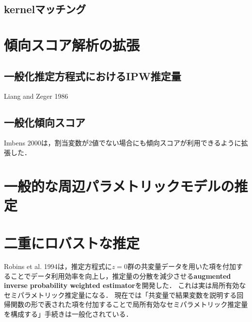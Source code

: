 \documentclass[uplatex,dvipdfmx]{jsreport}
\begin{document}
\subsection{kernelマッチング}

\section{傾向スコア解析の拡張}

\subsection{一般化推定方程式におけるIPW推定量}

\begin{tcolorbox}[colframe=ForestGreen, colback=ForestGreen!10!white,breakable,colbacktitle=ForestGreen!40!white,coltitle=black,fonttitle=\bfseries\sffamily,
title=]
    Liang and Zeger 1986
\end{tcolorbox}

\subsection{一般化傾向スコア}

\begin{tcolorbox}[colframe=ForestGreen, colback=ForestGreen!10!white,breakable,colbacktitle=ForestGreen!40!white,coltitle=black,fonttitle=\bfseries\sffamily,
title=]
    Imbens 2000は，割当変数が2値でない場合にも傾向スコアが利用できるように拡張した．
\end{tcolorbox}

\section{一般的な周辺パラメトリックモデルの推定}

\section{二重にロバストな推定}

\begin{tcolorbox}[colframe=ForestGreen, colback=ForestGreen!10!white,breakable,colbacktitle=ForestGreen!40!white,coltitle=black,fonttitle=\bfseries\sffamily,
title=]
    Robins et al. 1994は，推定方程式に$z=0$群の共変量データを用いた項を付加することでデータ利用効率を向上し，推定量の分散を減少させる\textbf{augmented inverse probability weighted estimator}を開発した．
    これは実は局所有効なセミパラメトリック推定量になる．
    現在では「共変量で結果変数を説明する回帰関数の形で表された項を付加することで局所有効なセミパラメトリック推定量を構成する」手続きは一般化されている．
\end{tcolorbox}
\end{document}
